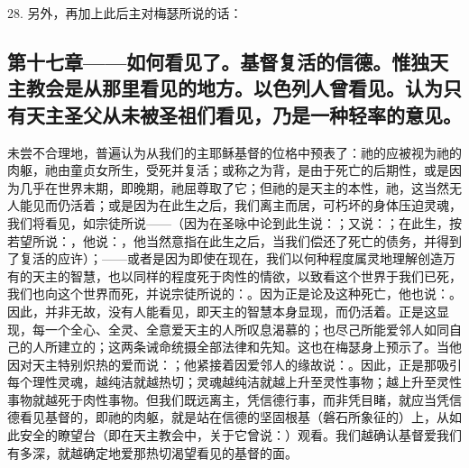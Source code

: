 28. 另外，再加上此后主对梅瑟所说的话：\par


\subsection{第十七章——如何看见了。基督复活的信德。惟独天主教会是从那里看见的地方。以色列人曾看见。认为只有天主圣父从未被圣祖们看见，乃是一种轻率的意见。}

未尝不合理地，普遍认为从我们的主耶稣基督的位格中预表了：祂的应被视为祂的肉躯，祂由童贞女所生，受死并复活；或称之为背，是由于死亡的后期性，或是因为几乎在世界末期，即晚期，祂屈尊取了它；但祂的是天主的本性，祂，这当然无人能见而仍活着；或是因为在此生之后，我们离主而居，可朽坏的身体压迫灵魂，我们将看见，如宗徒所说——（因为在圣咏中论到此生说：；又说：；在此生，按若望所说：，他说：，他当然意指在此生之后，当我们偿还了死亡的债务，并得到了复活的应许）；——或者是因为即使在现在，我们以何种程度属灵地理解创造万有的天主的智慧，也以同样的程度死于肉性的情欲，以致看这个世界于我们已死，我们也向这个世界而死，并说宗徒所说的：。因为正是论及这种死亡，他也说：。因此，并非无故，没有人能看见，即天主的智慧本身显现，而仍活着。正是这显现，每一个全心、全灵、全意爱天主的人所叹息渴慕的；也尽己所能爱邻人如同自己的人所建立的；这两条诫命统摄全部法律和先知。这也在梅瑟身上预示了。当他因对天主特别炽热的爱而说：；他紧接着因爱邻人的缘故说：。因此，正是那吸引每个理性灵魂，越纯洁就越热切；灵魂越纯洁就越上升至灵性事物；越上升至灵性事物就越死于肉性事物。但我们既远离主，凭信德行事，而非凭目睹，就应当凭信德看见基督的，即祂的肉躯，就是站在信德的坚固根基（磐石所象征的）上，从如此安全的瞭望台（即在天主教会中，关于它曾说：）观看。我们越确认基督爱我们有多深，就越确定地爱那热切渴望看见的基督的面。\par

